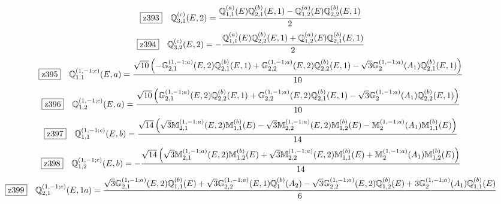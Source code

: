 \documentclass[fleqn,10pt,landscape]{jsarticle}
\begin{document}
\begin{dmath*}
\hspace*{3mm}\fbox{z393}\quad \mathbb{Q}_{3,1}^{(c)}(E,2)=\frac{\mathbb{Q}_{1,1}^{(a)}(E) \mathbb{Q}_{2,1}^{(b)}(E,1) - \mathbb{Q}_{1,2}^{(a)}(E) \mathbb{Q}_{2,2}^{(b)}(E,1)}{2}
\end{dmath*}
\begin{dmath*}
\hspace*{3mm}\fbox{z394}\quad \mathbb{Q}_{3,2}^{(c)}(E,2)=- \frac{\mathbb{Q}_{1,1}^{(a)}(E) \mathbb{Q}_{2,2}^{(b)}(E,1) + \mathbb{Q}_{1,2}^{(a)}(E) \mathbb{Q}_{2,1}^{(b)}(E,1)}{2}
\end{dmath*}
\begin{dmath*}
\hspace*{3mm}\fbox{z395}\quad \mathbb{Q}_{1,1}^{(1,-1;c)}(E,a)=\frac{\sqrt{10} \left(- \mathbb{G}_{2,1}^{(1,-1;a)}(E,2) \mathbb{Q}_{2,1}^{(b)}(E,1) + \mathbb{G}_{2,2}^{(1,-1;a)}(E,2) \mathbb{Q}_{2,2}^{(b)}(E,1) - \sqrt{3} \mathbb{G}_{2}^{(1,-1;a)}(A_{1}) \mathbb{Q}_{2,1}^{(b)}(E,1)\right)}{10}
\end{dmath*}
\begin{dmath*}
\hspace*{3mm}\fbox{z396}\quad \mathbb{Q}_{1,2}^{(1,-1;c)}(E,a)=\frac{\sqrt{10} \left(\mathbb{G}_{2,1}^{(1,-1;a)}(E,2) \mathbb{Q}_{2,2}^{(b)}(E,1) + \mathbb{G}_{2,2}^{(1,-1;a)}(E,2) \mathbb{Q}_{2,1}^{(b)}(E,1) - \sqrt{3} \mathbb{G}_{2}^{(1,-1;a)}(A_{1}) \mathbb{Q}_{2,2}^{(b)}(E,1)\right)}{10}
\end{dmath*}
\begin{dmath*}
\hspace*{3mm}\fbox{z397}\quad \mathbb{Q}_{1,1}^{(1,-1;c)}(E,b)=\frac{\sqrt{14} \left(\sqrt{3} \mathbb{M}_{2,1}^{(1,-1;a)}(E,2) \mathbb{M}_{1,1}^{(b)}(E) - \sqrt{3} \mathbb{M}_{2,2}^{(1,-1;a)}(E,2) \mathbb{M}_{1,2}^{(b)}(E) - \mathbb{M}_{2}^{(1,-1;a)}(A_{1}) \mathbb{M}_{1,1}^{(b)}(E)\right)}{14}
\end{dmath*}
\begin{dmath*}
\hspace*{3mm}\fbox{z398}\quad \mathbb{Q}_{1,2}^{(1,-1;c)}(E,b)=- \frac{\sqrt{14} \left(\sqrt{3} \mathbb{M}_{2,1}^{(1,-1;a)}(E,2) \mathbb{M}_{1,2}^{(b)}(E) + \sqrt{3} \mathbb{M}_{2,2}^{(1,-1;a)}(E,2) \mathbb{M}_{1,1}^{(b)}(E) + \mathbb{M}_{2}^{(1,-1;a)}(A_{1}) \mathbb{M}_{1,2}^{(b)}(E)\right)}{14}
\end{dmath*}
\begin{dmath*}
\hspace*{3mm}\fbox{z399}\quad \mathbb{Q}_{2,1}^{(1,-1;c)}(E,1a)=\frac{\sqrt{3} \mathbb{G}_{2,1}^{(1,-1;a)}(E,2) \mathbb{Q}_{1,1}^{(b)}(E) + \sqrt{3} \mathbb{G}_{2,2}^{(1,-1;a)}(E,1) \mathbb{Q}_{1}^{(b)}(A_{2}) - \sqrt{3} \mathbb{G}_{2,2}^{(1,-1;a)}(E,2) \mathbb{Q}_{1,2}^{(b)}(E) + 3 \mathbb{G}_{2}^{(1,-1;a)}(A_{1}) \mathbb{Q}_{1,1}^{(b)}(E)}{6}
\end{dmath*}
\end{document}
